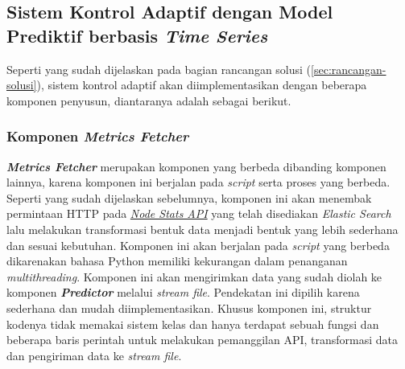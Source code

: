 \subsection{Sistem Kontrol Adaptif dengan Model Prediktif berbasis \textit{Time Series}}

Seperti yang sudah dijelaskan pada bagian rancangan solusi (\ref{sec:rancangan-solusi}), sistem kontrol adaptif akan diimplementasikan dengan beberapa komponen penyusun, diantaranya adalah sebagai berikut.

\subsubsection{Komponen \textit{Metrics Fetcher}}
\textbf{\textit{Metrics Fetcher}} merupakan komponen yang berbeda dibanding komponen lainnya, karena komponen ini berjalan pada \textit{script} serta proses yang berbeda. Seperti yang sudah dijelaskan sebelumnya, komponen ini akan menembak permintaan HTTP pada \href{https://www.elastic.co/guide/en/elasticsearch/reference/current/cluster-nodes-stats.html}{\textit{Node Stats API}} yang telah disediakan \textit{Elastic Search} lalu melakukan transformasi bentuk data menjadi bentuk yang lebih sederhana dan sesuai kebutuhan. Komponen ini akan berjalan pada \textit{script} yang berbeda dikarenakan bahasa Python memiliki kekurangan dalam penanganan \textit{multithreading}. Komponen ini akan mengirimkan data yang sudah diolah ke komponen \textbf{\textit{Predictor}} melalui \textit{stream file}. Pendekatan ini dipilih karena sederhana dan mudah diimplementasikan. Khusus komponen ini, struktur kodenya tidak memakai sistem kelas dan hanya terdapat sebuah fungsi dan beberapa baris perintah untuk melakukan pemanggilan API, transformasi data dan pengiriman data ke \textit{stream file}.

